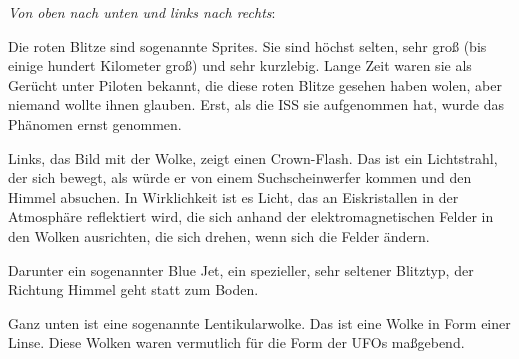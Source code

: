 \documentclass{scrartcl}
\begin{document}
\textit{Von oben nach unten und links nach rechts}:

Die roten Blitze sind sogenannte Sprites. Sie sind höchst selten, sehr groß (bis einige hundert Kilometer groß) und sehr kurzlebig. Lange Zeit waren sie als Gerücht unter Piloten bekannt, die diese roten Blitze gesehen haben wolen, aber niemand wollte ihnen glauben. Erst, als die ISS sie aufgenommen hat, wurde das Phänomen ernst genommen. 

Links, das Bild mit der Wolke, zeigt einen Crown-Flash. Das ist ein Lichtstrahl, der sich bewegt, als würde er von einem Suchscheinwerfer kommen und den Himmel absuchen. In Wirklichkeit ist es Licht, das an Eiskristallen in der Atmosphäre reflektiert wird, die sich anhand der elektromagnetischen Felder in den Wolken ausrichten, die sich drehen, wenn sich die Felder ändern. 

Darunter ein sogenannter Blue Jet, ein spezieller, sehr seltener Blitztyp, der Richtung Himmel geht statt zum Boden. 

Ganz unten ist eine sogenannte Lentikularwolke. Das ist eine Wolke in Form einer Linse. Diese Wolken waren vermutlich für die Form der UFOs maßgebend.
\end{document}
